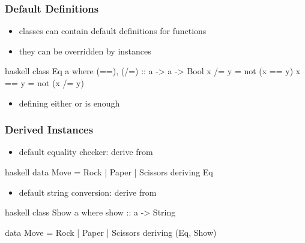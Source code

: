 \documentclass[dvipsnames]{beamer}
\theoremstyle{plain}
\begin{document}
\begin{frame}[fragile]
  \frametitle{Default Definitions}

  \begin{itemize}
    \item classes can contain default definitions for functions
    \item they can be overridden by instances
  \end{itemize}

  \pause
  \begin{exampleblock}{}
    \begin{pygments}{haskell}
class Eq a where
  (==), (/=) :: a -> a -> Bool
  x /= y = not (x == y)
  x == y = not (x /= y)
    \end{pygments}
  \end{exampleblock}

  \begin{itemize}
    \item defining either  or 
      is enough
  \end{itemize}
\end{frame}

\begin{frame}[fragile]
  \frametitle{Derived Instances}

  \begin{itemize}
    \item default equality checker: derive from 
  \end{itemize}

  \begin{exampleblock}{}
    \begin{pygments}{haskell}
data Move = Rock | Paper | Scissors
            deriving Eq
    \end{pygments}
  \end{exampleblock}

  \pause
  \begin{itemize}
    \item default string conversion: derive from 
  \end{itemize}

  \begin{exampleblock}{}
    \begin{pygments}{haskell}
class Show a where
  show :: a -> String

data Move = Rock | Paper | Scissors
            deriving (Eq, Show)
   \end{pygments}
  \end{exampleblock}
\end{frame}
\end{document}
